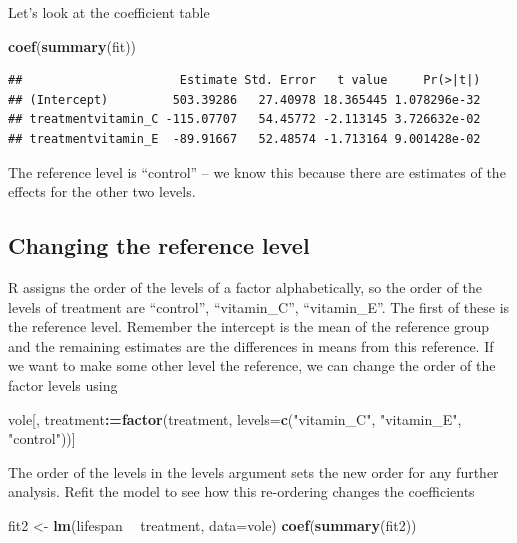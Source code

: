 \documentclass[]{book}
\newenvironment{Shaded}{\begin{snugshade}}{\end{snugshade}}
\newcommand{\KeywordTok}[1]{\textcolor[rgb]{0.13,0.29,0.53}{\textbf{#1}}}
\newcommand{\DataTypeTok}[1]{\textcolor[rgb]{0.13,0.29,0.53}{#1}}
\newcommand{\StringTok}[1]{\textcolor[rgb]{0.31,0.60,0.02}{#1}}
\newcommand{\OperatorTok}[1]{\textcolor[rgb]{0.81,0.36,0.00}{\textbf{#1}}}
\newcommand{\ErrorTok}[1]{\textcolor[rgb]{0.64,0.00,0.00}{\textbf{#1}}}
\newcommand{\NormalTok}[1]{#1}
\begin{document}
Let's look at the coefficient table

\begin{Shaded}
\begin{Highlighting}[]
\KeywordTok{coef}\NormalTok{(}\KeywordTok{summary}\NormalTok{(fit))}
\end{Highlighting}
\end{Shaded}

\begin{verbatim}
##                      Estimate Std. Error   t value     Pr(>|t|)
## (Intercept)         503.39286   27.40978 18.365445 1.078296e-32
## treatmentvitamin_C -115.07707   54.45772 -2.113145 3.726632e-02
## treatmentvitamin_E  -89.91667   52.48574 -1.713164 9.001428e-02
\end{verbatim}

The reference level is ``control'' -- we know this because there are
estimates of the effects for the other two levels.

\subsection{Changing the reference
level}\label{changing-the-reference-level}

R assigns the order of the levels of a factor alphabetically, so the
order of the levels of treatment are ``control'', ``vitamin\_C'',
``vitamin\_E''. The first of these is the reference level. Remember the
intercept is the mean of the reference group and the remaining estimates
are the differences in means from this reference. If we want to make
some other level the reference, we can change the order of the factor
levels using

\begin{Shaded}
\begin{Highlighting}[]
\NormalTok{vole[, treatment}\OperatorTok{:}\ErrorTok{=}\KeywordTok{factor}\NormalTok{(treatment, }
                         \DataTypeTok{levels=}\KeywordTok{c}\NormalTok{(}\StringTok{"vitamin_C"}\NormalTok{, }\StringTok{"vitamin_E"}\NormalTok{, }\StringTok{"control"}\NormalTok{))]}
\end{Highlighting}
\end{Shaded}

The order of the levels in the levels argument sets the new order for
any further analysis. Refit the model to see how this re-ordering
changes the coefficients

\begin{Shaded}
\begin{Highlighting}[]
\NormalTok{fit2 <-}\StringTok{ }\KeywordTok{lm}\NormalTok{(lifespan }\OperatorTok{~}\StringTok{ }\NormalTok{treatment, }\DataTypeTok{data=}\NormalTok{vole)}
\KeywordTok{coef}\NormalTok{(}\KeywordTok{summary}\NormalTok{(fit2))}
\end{Highlighting}
\end{Shaded}
\end{document}
